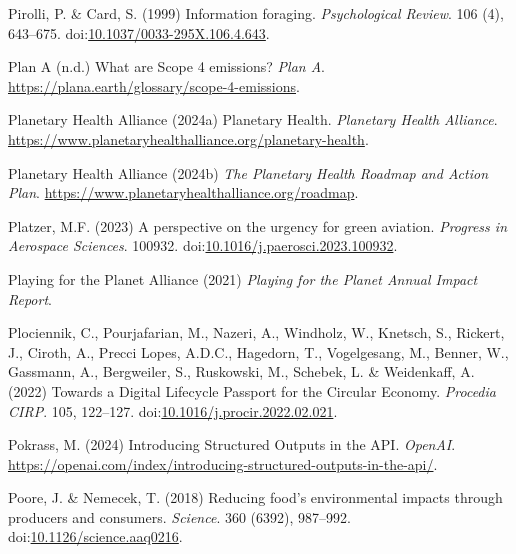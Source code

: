 \documentclass[
  letterpaper,
  DIV=11,
  numbers=noendperiod]{scrartcl}
\newlength{\cslhangindent}
\newenvironment{CSLReferences}[2] %
 {\begin{list}{}{%
  \setlength{\itemindent}{0pt}
  \setlength{\leftmargin}{0pt}
  \setlength{\parsep}{0pt}
  \ifodd #1
   \setlength{\leftmargin}{\cslhangindent}
   \setlength{\itemindent}{-1\cslhangindent}
  \fi
  \setlength{\itemsep}{#2\baselineskip}}}
 {\end{list}}
\begin{document}
\begin{CSLReferences}{0}{1}
Pirolli, P. \& Card, S. (1999) Information foraging. \emph{Psychological
Review}. 106 (4), 643--675.
doi:\href{https://doi.org/10.1037/0033-295X.106.4.643}{10.1037/0033-295X.106.4.643}.

Plan A (n.d.) What are {Scope} 4 emissions? \emph{Plan A}.
\url{https://plana.earth/glossary/scope-4-emissions}.

Planetary Health Alliance (2024a) Planetary {Health}. \emph{Planetary
Health Alliance}.
\url{https://www.planetaryhealthalliance.org/planetary-health}.

Planetary Health Alliance (2024b) \emph{The {Planetary Health Roadmap}
and {Action Plan}}.
\url{https://www.planetaryhealthalliance.org/roadmap}.

Platzer, M.F. (2023) A perspective on the urgency for green aviation.
\emph{Progress in Aerospace Sciences}. 100932.
doi:\href{https://doi.org/10.1016/j.paerosci.2023.100932}{10.1016/j.paerosci.2023.100932}.

Playing for the Planet Alliance (2021) \emph{Playing for the {Planet
Annual Impact Report}}.

Plociennik, C., Pourjafarian, M., Nazeri, A., Windholz, W., Knetsch, S.,
Rickert, J., Ciroth, A., Precci Lopes, A.D.C., Hagedorn, T.,
Vogelgesang, M., Benner, W., Gassmann, A., Bergweiler, S., Ruskowski,
M., Schebek, L. \& Weidenkaff, A. (2022) Towards a {Digital Lifecycle
Passport} for the {Circular Economy}. \emph{Procedia CIRP}. 105,
122--127.
doi:\href{https://doi.org/10.1016/j.procir.2022.02.021}{10.1016/j.procir.2022.02.021}.

Pokrass, M. (2024) Introducing {Structured Outputs} in the {API}.
\emph{OpenAI}.
\url{https://openai.com/index/introducing-structured-outputs-in-the-api/}.

Poore, J. \& Nemecek, T. (2018) Reducing food's environmental impacts
through producers and consumers. \emph{Science}. 360 (6392), 987--992.
doi:\href{https://doi.org/10.1126/science.aaq0216}{10.1126/science.aaq0216}.


\end{CSLReferences}
\end{document}
